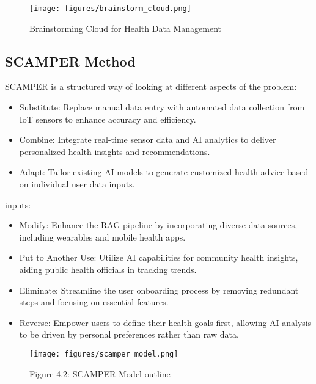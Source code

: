 \begin{figure}[H]
    \centering
    \texttt{[image: figures/brainstorm\_cloud.png]}
    \caption{Brainstorming Cloud for Health Data Management}
\end{figure}

\subsection{SCAMPER Method}
SCAMPER is a structured way of looking at different aspects of the problem:
\begin{itemize}
    \item Substitute: Replace manual data entry with automated data collection from IoT sensors to enhance accuracy and efficiency.
    \item Combine: Integrate real-time sensor data and AI analytics to deliver personalized health insights and recommendations.
    \item Adapt: Tailor existing AI models to generate customized health advice based on individual user data inputs.
\end{itemize}

inputs:
\begin{itemize}
    \item Modify: Enhance the RAG pipeline by incorporating diverse data sources, including wearables and mobile health apps.
    \item Put to Another Use: Utilize AI capabilities for community health insights, aiding public health officials in tracking trends.
    \item Eliminate: Streamline the user onboarding process by removing redundant steps and focusing on essential features.
    \item Reverse: Empower users to define their health goals first, allowing AI analysis to be driven by personal preferences rather than raw data.
\end{itemize}

\begin{figure}[H]
    \centering
    \texttt{[image: figures/scamper\_model.png]}
    \caption{Figure 4.2: SCAMPER Model outline}
\end{figure}


